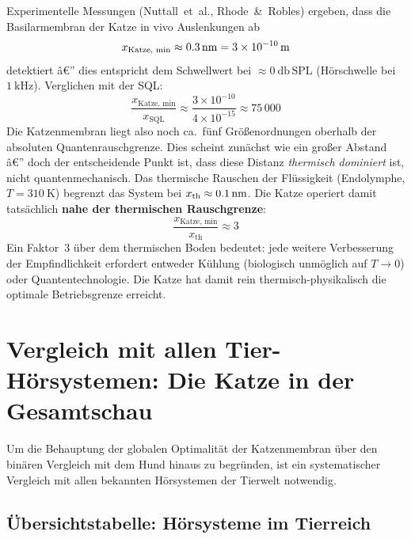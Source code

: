 ﻿\documentclass[12pt,a4paper,titlepage]{report}
\begin{document}
Experimentelle Messungen (Nuttall~et~al., Rhode~\&~Robles) ergeben, dass die
Basilarmembran der Katze in vivo Auslenkungen ab
\[
  x_{\text{Katze, min}} \approx \SI{0{,}3}{\nano\meter} = \SI{3e-10}{\meter}
\]
detektiert â€” dies entspricht dem Schwellwert bei $\approx \SI{0}{\decibel}\,\text{SPL}$
(Hörschwelle bei $\SI{1}{\kilo\hertz}$). Verglichen mit der SQL:
\[
  \frac{x_{\text{Katze, min}}}{x_{\mathrm{SQL}}} \approx \frac{3\times10^{-10}}{4\times10^{-15}} \approx 75\,000
\]
Die Katzenmembran liegt also noch ca.\ fünf Größenordnungen oberhalb der
absoluten Quantenrauschgrenze.
Dies scheint zunächst wie ein großer Abstand â€” doch der entscheidende Punkt ist,
dass diese Distanz \emph{thermisch dominiert} ist, nicht quantenmechanisch.
Das thermische Rauschen der Flüssigkeit (Endolymphe, $T = \SI{310}{\kelvin}$)
begrenzt das System bei $x_{\text{th}} \approx \SI{0{,}1}{\nano\meter}$.
Die Katze operiert damit tatsächlich \textbf{nahe der thermischen Rauschgrenze}:
\[
  \frac{x_{\text{Katze, min}}}{x_{\text{th}}} \approx 3
\]
Ein Faktor~3 über dem thermischen Boden bedeutet: jede weitere Verbesserung
der Empfindlichkeit erfordert entweder Kühlung (biologisch unmöglich auf
$T \to 0$) oder Quantentechnologie. Die Katze hat damit rein thermisch-physikalisch
die optimale Betriebsgrenze erreicht.

\section{Vergleich mit allen Tier-Hörsystemen: Die Katze in der Gesamtschau}
\label{sec:tierwelt}

Um die Behauptung der globalen Optimalität der Katzenmembran über den binären
Vergleich mit dem Hund hinaus zu begründen, ist ein systematischer Vergleich mit
allen bekannten Hörsystemen der Tierwelt notwendig.

\subsection{Übersichtstabelle: Hörsysteme im Tierreich}
\end{document}
